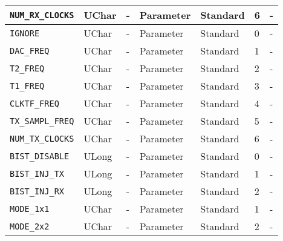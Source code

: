 \documentclass{article}
\begin{document}
\begin{landscape}
\begin{scriptsize}
\begin{longtable}{|p{3.6cm}|p{8.1cm}|p{1.4cm}|p{1.3cm}|p{1.4cm}|p{2.5cm}|p{3.6cm}|}
			\hline
      \verb+NUM_RX_CLOCKS+             & UChar        & -               & Parameter             & Standard                         & 6                   & - \\
			\hline
      \verb+IGNORE+                    & UChar        & -               & Parameter             & Standard                         & 0                   & - \\
			\hline
      \verb+DAC_FREQ+                  & UChar        & -               & Parameter             & Standard                         & 1                   & - \\
			\hline
      \verb+T2_FREQ+                   & UChar        & -               & Parameter             & Standard                         & 2                   & - \\
			\hline
      \verb+T1_FREQ+                   & UChar        & -               & Parameter             & Standard                         & 3                   & - \\
			\hline
      \verb+CLKTF_FREQ+                & UChar        & -               & Parameter             & Standard                         & 4                   & - \\
			\hline
      \verb+TX_SAMPL_FREQ+             & UChar        & -               & Parameter             & Standard                         & 5                   & - \\
			\hline
      \verb+NUM_TX_CLOCKS+             & UChar        & -               & Parameter             & Standard                         & 6                   & - \\
			\hline
      \verb+BIST_DISABLE+              & ULong        & -               & Parameter             & Standard                         & 0                   & - \\
			\hline
      \verb+BIST_INJ_TX+               & ULong        & -               & Parameter             & Standard                         & 1                   & - \\
			\hline
      \verb+BIST_INJ_RX+               & ULong        & -               & Parameter             & Standard                         & 2                   & - \\
			\hline
      \verb+MODE_1x1+                  & UChar        & -               & Parameter             & Standard                         & 1                   & - \\
			\hline
      \verb+MODE_2x2+                  & UChar        & -               & Parameter             & Standard                         & 2                   & - \\

\end{longtable}
\end{scriptsize}
\end{landscape}
\end{document}

